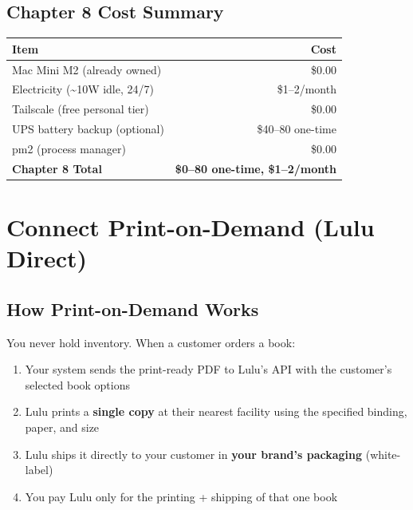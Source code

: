 \documentclass[12pt, letterpaper, oneside]{book}
\begin{document}
\section{Chapter 8 Cost Summary}

\begin{table}[H]
\centering
\begin{tabular}{lr}
\toprule
\textbf{Item} & \textbf{Cost} \\
\midrule
Mac Mini M2 (already owned) & \$0.00 \\
Electricity (\~{}10W idle, 24/7) & \$1--2/month \\
Tailscale (free personal tier) & \$0.00 \\
UPS battery backup (optional) & \$40--80 one-time \\
pm2 (process manager) & \$0.00 \\
\midrule
\textbf{Chapter 8 Total} & \textbf{\$0--80 one-time, \$1--2/month} \\
\bottomrule
\end{tabular}
\end{table}


\chapter{Connect Print-on-Demand (Lulu Direct)}

\section{How Print-on-Demand Works}

You never hold inventory. When a customer orders a book:

\begin{enumerate}[leftmargin=2em]
  \item Your system sends the print-ready PDF to Lulu's API with the customer's selected book options
  \item Lulu prints a \textbf{single copy} at their nearest facility using the specified binding, paper, and size
  \item Lulu ships it directly to your customer in \textbf{your brand's packaging} (white-label)
  \item You pay Lulu only for the printing + shipping of that one book
\end{enumerate}
\end{document}
